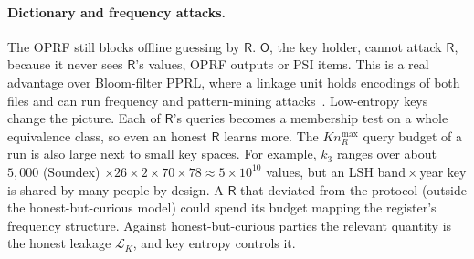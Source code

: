 \documentclass[10pt]{article}
\newcommand{\Rp}{\mathsf{R}}
\newcommand{\Op}{\mathsf{O}}
\begin{document}
\paragraph{Dictionary and frequency attacks.} The OPRF still blocks offline guessing by $\Rp$. $\Op$, the key holder, cannot attack $\Rp$, because it never sees $\Rp$'s values, OPRF outputs or PSI items. This is a real advantage over Bloom-filter PPRL, where a linkage unit holds encodings of both files and can run frequency and pattern-mining attacks~\cite{kuzu2011constraint,niedermeyer2014cryptanalysis,christen2018precise}. Low-entropy keys change the picture. Each of $\Rp$'s queries becomes a membership test on a whole equivalence class, so even an honest $\Rp$ learns more. The $K n_R^{\max}$ query budget of a run is also large next to small key spaces. For example, $k_3$ ranges over about $5{,}000$ (Soundex) $\times26\times2\times70\times78\approx5\times10^{10}$ values, but an LSH band${}\times{}$year key is shared by many people by design. A $\Rp$ that deviated from the protocol (outside the honest-but-curious model) could spend its budget mapping the register's frequency structure. Against honest-but-curious parties the relevant quantity is the honest leakage $\mathcal L_K$, and key entropy controls it.
\end{document}
